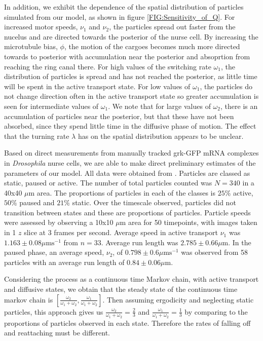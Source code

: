 \documentclass[twocolumn]{biophys}
\begin{document}
In addition, we exhibit the dependence of the spatial distribution of particles simulated from our model, as shown in figure \ref{FIG:Sensitivity_of_Q}.
For increased motor speeds, $\nu_1$ and $\nu_2$, the particles spread out faster from the nucelus and are directed towards the posterior of the nurse cell.
By increasing the microtubule bias, $\phi$, the motion of the cargoes becomes much more directed towards to posterior with accumulation near the posterior and absoprtion from reaching the ring canal there.
For high values of the switching rate $\omega_1$, the distribution of particles is spread and has not reached the posterior, as little time will be spent in the active transport state.
For low values of $\omega_1$, the particles do not change direction often in the active transport state so greater accumulation is seen for intermediate values of $\omega_1$.
We note that for large values of $\omega_2$, there is an accumulation of particles near the posterior, but that these have not been absorbed, since they spend little time in the diffusive phase of motion.
The effect that the turning rate $\lambda$ has on the spatial distribution appears to be unclear.

Based on direct measurements from manually tracked grk-GFP mRNA complexes in \textit{Drosophila} nurse cells, we are able to make direct preliminary estimates of the parameters of our model.
All data were obtained from \citet{DavidsonPhD2015}.
Particles are classed as static, paused or active.
The number of total particles counted was $N=340$ in a 40x40 $\mu \text{m}$ area.
The proportions of particles in each of the classes is $25\%$ active, $50\%$ paused and $21\%$ static. 
Over the timescale observed, particles did not transition between states and these are proportions of particles. 
Particle speeds were assessed by observing a 10x10 $\mu \text{m}$ area for 50 timepoints, with images taken in 1 $z$ slice at 3 frames per second. 
Average speed in active transport $\nu_1 $ was  $1.163 \pm 0.08 \mu \text{ms}^{-1}$ from $n=33$. 
Average run length was $2.785 \pm 0.66 \mu \text{m}$. 
In the paused phase, an average speed, $\nu_2$, of $0.798 \pm 0.6 \mu \text{ms}^{-1}$ was observed from 58 particles with an average run length of  $0.84 \pm 0.06 \mu \text{m}$. 

Considering the process as a continuous time Markov chain, with active transport and diffusive states, we obtain that the steady state of the continuous time markov chain is $[\frac{\omega_2 }{\omega_1 + \omega_2},\frac{ \omega_1}{\omega_1+\omega_2}]$. 
Then assuming ergodicity and neglecting static particles, this approach gives us $\frac{\omega_2 }{\omega_1 + \omega_2} = \frac{2}{3}$ and $\frac{\omega_1 }{\omega_1 + \omega_2} = \frac{1}{3}$ by comparing to the proportions of particles observed in each state.
Therefore the rates of falling off and reattaching must be different.
\end{document}
